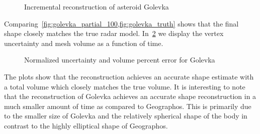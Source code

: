 \documentclass[journal]{new-aiaa}
\begin{document}
\begin{figure}[htbp]
    \caption[Asteroid Golevka incremental reconstruction]{Incremental reconstruction of asteroid Golevka~\label{fig:golevka_reconstruction}}
\end{figure}
Comparing~\cref{fig:golevka_partial_100,fig:golevka_truth} shows that the final shape closely matches the true radar model.
In~\cref{fig:golevka_metrics} we display the vertex uncertainty and mesh volume as a function of time.

\begin{figure}[htbp]
    \centering
    
    \caption{Normalized uncertainty and volume percent error for Golevka\label{fig:golevka_metrics}}
\end{figure}

The plots show that the reconstruction achieves an accurate shape estimate with a total volume which closely matches the true volume.
It is interesting to note that the reconstruction of Golevka achieves an accurate shape reconstruction in a much smaller amount of time as compared to Geographos.
This is primarily due to the smaller size of Golevka and the relatively spherical shape of the body in contrast to the highly elliptical shape of Geographos.
\end{document}
